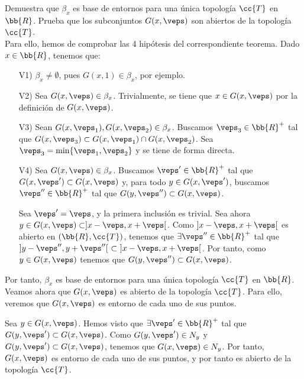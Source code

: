 \documentclass[12pt]{article}
\newcommand{\T}[0]{\cc{T}}
\begin{document}
    \begin{ejercicio}[4 puntos]
        Demuestra que $\beta_x$ es base de entornos para una única topología $\T$
        en $\bb{R}$. Prueba que los subconjuntos $G(x,\veps)$ son abiertos de la topología $\T$.\\

        Para ello, hemos de comprobar las 4 hipótesis del correspondiente teorema. Dado $x\in \bb{R}$, tenemos que:
        \begin{enumerate}
            \item[V1)] $\beta_x\neq \emptyset$, pues $G(x,1)\in \beta_x$, por ejemplo.
            \item[V2)] Sea $G(x,\veps) \in \beta_x$. Trivialmente, se tiene que $x\in G(x,\veps)$ por la definición de $G(x,\veps)$.
            \item[V3)] Sean $G(x,\veps_1), G(x,\veps_2)\in \beta_x$. Buscamos $\veps_3\in \bb{R}^+$ tal que $G(x,\veps_3)\subset G(x,\veps_1)\cap G(x,\veps_2)$.
            Sea $\veps_3 = \min\{\veps_1,\veps_2\}$ y se tiene de forma directa.
            \item[V4)] Sea $G(x,\veps)\in \beta_x$. Buscamos $\veps'\in \bb{R}^+$ tal que $G(x,\veps')\subset G(x,\veps)$ y, para todo $y\in G(x,\veps')$, buscamos $\veps''\in \bb{R}^+$ tal que $G(y,\veps'')\subset G(x,\veps)$.
            
            Sea $\veps' = \veps$, y la primera inclusión es trivial.
            Sea ahora $y\in G(x,\veps)\subset]x-\veps,x+\veps[$. Como $]x-\veps,x+\veps[$ es abierto en $(\bb{R},\T)$,
            tenemos que $\exists \veps''\in \bb{R}^+$ tal que $]y-\veps'',y+\veps''[~\subset~]x-\veps,x+\veps[$.
            Por tanto, como $y\in G(x,\veps)$ tenemos que $G(y,\veps'')\subset G(x,\veps)$.
        \end{enumerate}

        Por tanto, $\beta_x$ es base de entornos para una única topología $\T$ en $\bb{R}$.
        Veamos ahora que $G(x,\veps)$ es abierto de la topología $\T$. Para ello, veremos que $G(x,\veps)$ es entorno de cada uno de sus puntos.

        Sea $y\in G(x,\veps)$. Hemos visto que $\exists \veps'\in \bb{R}^+$ tal que $G(y,\veps')\subset G(x,\veps)$. Como $G(y,\veps')\in N_y$ y $G(y,\veps')\subset G(x,\veps)$, tenemos que $G(x,\veps)\in N_y$. Por tanto, $G(x,\veps)$ es entorno de cada uno de sus puntos, y por tanto es abierto de la topología $\T$.
    \end{ejercicio}
\end{document}

